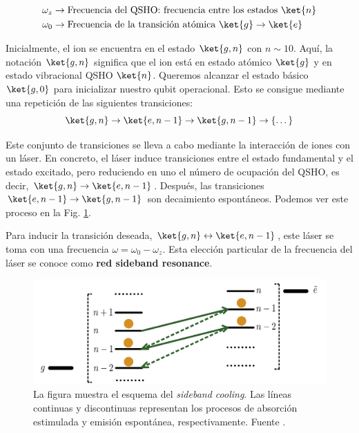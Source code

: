 \begin{equation} 
\begin{aligned}
\omega_z & \rightarrow \text{Frecuencia del QSHO: frecuencia entre los estados } \ket{n} \\
\omega_0 & \rightarrow \text{Frecuencia de la transición atómica } \ket{g} \rightarrow \ket{e}
\end{aligned}
\end{equation}

Inicialmente, el ion se encuentra en el estado $\ket{g,n}$ con $n \sim 10$. Aquí, la notación $\ket{g,n}$ significa que el ion está en estado atómico $\ket{g}$ y en estado vibracional QSHO $\ket{n}$. Queremos alcanzar el estado básico $\ket{g,0}$ para inicializar nuestro qubit operacional. Esto se consigue mediante una repetición de las siguientes transiciones:
	\begin{equation}
	\ket{g,n} \rightarrow \ket{e,n-1} \rightarrow \ket{g, n-1} \rightarrow \{ \dots \}
	\end{equation}
	



Este conjunto de transiciones se lleva a cabo mediante la interacción de iones con un láser. En concreto, el láser induce transiciones entre el estado fundamental y el estado excitado, pero reduciendo en uno el número de ocupación del QSHO, es decir, $\ket{g,n} \rightarrow \ket{e,n-1}$. Después, las transiciones $\ket{e,n-1} \rightarrow \ket{g, n-1}$ son decaimiento espontáneos. Podemos ver este proceso en la Fig. \ref{Fig_ions_sideband_cooling}.

Para inducir la transición deseada,  $\ket{g,n} \leftrightarrow \ket{e,n-1}$, este láser se toma con una frecuencia $\omega = \omega_0 - \omega_z$. Esta elección particular de la frecuencia del láser se conoce como \textbf{red sideband resonance}.

	\begin{figure}[b]
	\centering 
	\includegraphics[width=0.7\linewidth]{Figuras/Fig_ions_sideband_cooling.png}
	\caption{La figura muestra el esquema del \textit{sideband cooling}. Las líneas continuas y discontinuas representan los procesos de absorción estimulada y emisión espontánea, respectivamente. Fuente \cite{bib_ions_main}.}
	\label{Fig_ions_sideband_cooling}
	\end{figure}



